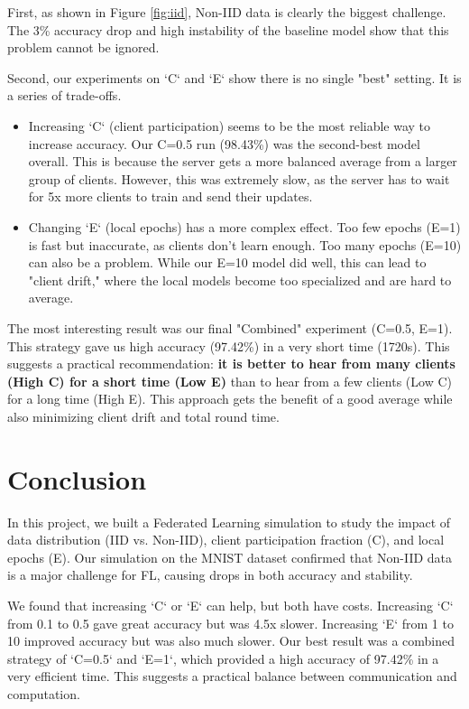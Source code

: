 \documentclass[conference]{IEEEtran}
\begin{document}
First, as shown in Figure \ref{fig:iid}, Non-IID data is clearly the biggest challenge. The 3\% accuracy drop and high instability of the baseline model show that this problem cannot be ignored.

Second, our experiments on `C` and `E` show there is no single "best" setting. It is a series of trade-offs.
\begin{itemize}
    \item Increasing `C` (client participation) seems to be the most reliable way to increase accuracy. Our C=0.5 run (98.43\%) was the second-best model overall. This is because the server gets a more balanced average from a larger group of clients. However, this was extremely slow, as the server has to wait for 5x more clients to train and send their updates.
    \item Changing `E` (local epochs) has a more complex effect. Too few epochs (E=1) is fast but inaccurate, as clients don't learn enough. Too many epochs (E=10) can also be a problem. While our E=10 model did well, this can lead to "client drift," where the local models become too specialized and are hard to average.
\end{itemize}

The most interesting result was our final "Combined" experiment (C=0.5, E=1). This strategy gave us high accuracy (97.42\%) in a very short time (1720s). This suggests a practical recommendation: \textbf{it is better to hear from many clients (High C) for a short time (Low E)} than to hear from a few clients (Low C) for a long time (High E). This approach gets the benefit of a good average while also minimizing client drift and total round time.


\section{Conclusion}
In this project, we built a Federated Learning simulation to study the impact of data distribution (IID vs. Non-IID), client participation fraction (C), and local epochs (E). Our simulation on the MNIST dataset confirmed that Non-IID data is a major challenge for FL, causing drops in both accuracy and stability.

We found that increasing `C` or `E` can help, but both have costs. Increasing `C` from 0.1 to 0.5 gave great accuracy but was 4.5x slower. Increasing `E` from 1 to 10 improved accuracy but was also much slower. Our best result was a combined strategy of `C=0.5` and `E=1`, which provided a high accuracy of 97.42\% in a very efficient time. This suggests a practical balance between communication and computation.
\end{document}
